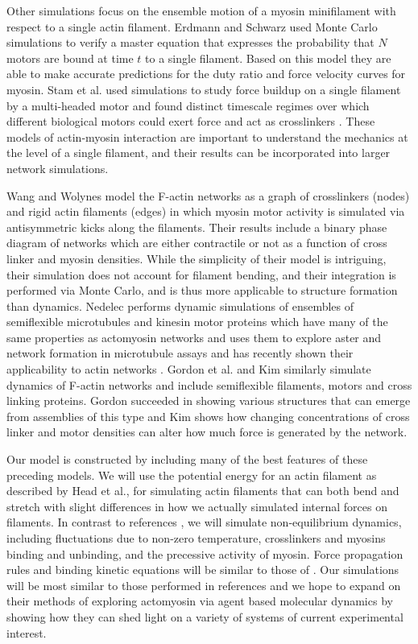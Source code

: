 \documentclass[12pt]{article}
\begin{document}
Other simulations focus on the ensemble motion of a myosin minifilament with respect to a single actin filament.  
Erdmann and Schwarz used Monte Carlo simulations to verify a master equation that expresses the probability that $N$ motors are 
bound at time $t$ to a single filament\cite{erdmann2012}. Based on this model they are able to make accurate predictions for 
the duty ratio and force velocity curves for myosin. Stam et al. used simulations to study force buildup on a single 
filament by a multi-headed motor and found
distinct timescale regimes over which different biological motors could exert force and act as crosslinkers
\cite{stam2015}. These models of actin-myosin interaction are important to understand the mechanics at
the level of a single filament, and their results can be incorporated into larger network simulations. 
\par
Wang and Wolynes \cite{wang2012} model the F-actin networks as a graph of crosslinkers (nodes) and rigid actin filaments
(edges) in which myosin motor activity is simulated via antisymmetric kicks along the filaments. Their results include a
binary phase diagram of networks which are either contractile or not as a function of cross linker and myosin
densities. While the simplicity of their model is intriguing, their simulation does not account for filament bending, 
and their integration is performed via Monte Carlo, and is thus more applicable to structure formation than dynamics.
Nedelec performs dynamic simulations of ensembles of semiflexible microtubules and kinesin motor proteins
which have many of the same properties as actomyosin networks and uses them to explore aster and network formation in microtubule
assays \cite{nedelec2007} and has recently shown their applicability to actin networks \cite{ennomani2016}.
Gordon et al. \cite{gordon2012} and Kim \cite{kim2014} similarly simulate dynamics of F-actin networks and include
semiflexible filaments, motors and cross linking proteins. Gordon succeeded in showing various structures that can emerge
from assemblies of this type and Kim shows how changing concentrations of cross linker and motor densities can alter how
much force is generated by the network.
\par
Our model is constructed by including many of the best features of these preceding models.
We will use the potential energy for an actin filament as described by Head et al., for simulating actin filaments that can 
both bend and stretch with slight differences in how we actually simulated 
internal forces on filaments. In contrast to references \cite{head2003, dasanyake2011}, we will 
simulate non-equilibrium dynamics, including fluctuations due to non-zero temperature,  
crosslinkers and myosins binding and unbinding, and the precessive activity of myosin.  
Force propagation rules and binding kinetic equations will be similar to those of
\cite{nedelec2007, gordon2012}. Our simulations will be most similar to those
performed in references \cite{kim2014, ennomani2016} and we hope to expand on
their methods of exploring actomyosin via agent based molecular dynamics by
showing how they can shed light on a variety of systems of current experimental interest.
\end{document}
